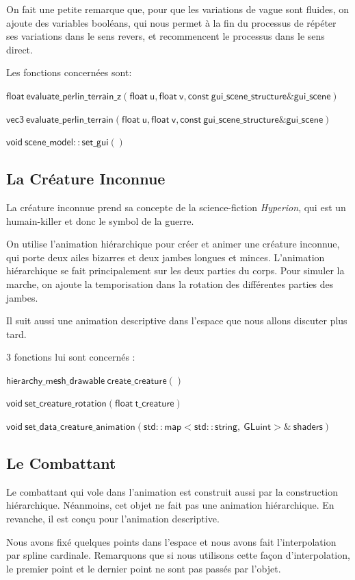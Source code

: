 \documentclass[utf8, a4paper, 12pt]{article}
\begin{document}
On fait une petite remarque que, pour que les variations de vague sont fluides, on ajoute des variables booléans, qui nous permet à la fin du processus de répéter ses variations dans le sens revers, et recommencent le processus dans le sens direct.

Les fonctions concernées sont:


$\mathsf{float\ evaluate\_perlin\_terrain\_z(float\ u, float\ v, const\ gui\_scene\_structure\& gui\_scene)}$

$\mathsf{vec3\ evaluate\_perlin\_terrain(float\ u, float\ v, const\ gui\_scene\_structure\& gui\_scene)}$

$\mathsf{void\ scene\_model::set\_gui()}$

\subsection{La Créature Inconnue}
La créature inconnue prend sa concepte de la science-fiction \textit{Hyperion}, qui est un humain-killer et donc le symbol de la guerre.

On utilise l'animation hiérarchique pour créer et animer une créature inconnue, qui porte deux ailes bizarres et deux jambes longues et minces. L'animation hiérarchique se fait principalement sur les deux parties du corps. Pour simuler la marche, on ajoute la temporisation dans la rotation des différentes parties des jambes.

Il suit aussi une animation descriptive dans l'espace que nous allons discuter plus tard.

3 fonctions lui sont concernés : 

$\mathsf{hierarchy\_mesh\_drawable \ create\_creature()}$ 

$\mathsf{void\  set\_creature\_rotation(float\  t\_creature)}$ 

$\mathsf{void\  set\_data\_creature\_animation(std::map<std::string,\ GLuint>\&\ shaders)}$

\subsection{Le Combattant}
Le combattant qui vole dans l'animation est construit aussi par la construction hiérarchique. Néanmoins, cet objet ne fait pas une animation hiérarchique. En revanche, il est conçu pour l'animation descriptive.

Nous avons fixé quelques points dans l'espace et nous avons fait l'interpolation par spline cardinale. Remarquons que si nous utilisons cette façon d'interpolation, le premier point et le dernier point ne sont pas passés par l'objet.
\end{document}
